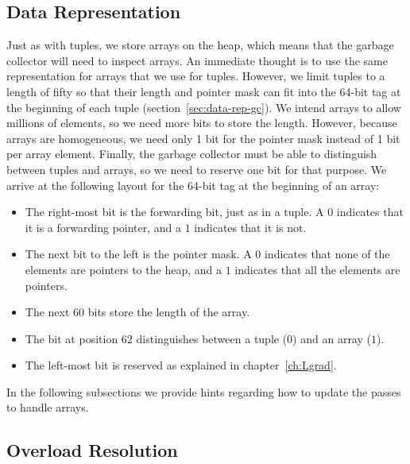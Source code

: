\documentclass[7x10]{TimesAPriori_MIT}%
\numberwithin{theorem}{chapter}
\numberwithin{definition}{chapter}
\numberwithin{equation}{chapter}
\begin{document}
\subsection{Data Representation}
\label{sec:array-rep}

Just as with tuples, we store arrays on the heap, which means that the
garbage collector will need to inspect arrays. An immediate thought is
to use the same representation for arrays that we use for tuples.
However, we limit tuples to a length of fifty so that their length and
pointer mask can fit into the 64-bit tag at the beginning of each
tuple (section~\ref{sec:data-rep-gc}). We intend arrays to allow
millions of elements, so we need more bits to store the length.
However, because arrays are homogeneous, we need only 1 bit for the
pointer mask instead of 1 bit per array element.  Finally, the
garbage collector must be able to distinguish between tuples
and arrays, so we need to reserve one bit for that purpose.  We
arrive at the following layout for the 64-bit tag at the beginning of
an array:
\begin{itemize}
\item The right-most bit is the forwarding bit, just as in a tuple.
  A $0$ indicates that it is a forwarding pointer, and a $1$ indicates
  that it is not.
  
\item The next bit to the left is the pointer mask. A $0$ indicates
  that none of the elements are pointers to the heap, and a $1$
  indicates that all the elements are pointers.

\item The next $60$ bits store the length of the array.

\item The bit at position $62$ distinguishes between a tuple ($0$)
  and an array ($1$).

\item The left-most bit is reserved as explained in
  chapter~\ref{ch:Lgrad}.
\end{itemize}



In the following subsections we provide hints regarding how to update
the passes to handle arrays.


\subsection{Overload Resolution}
\label{sec:array-resolution}
\end{document}
